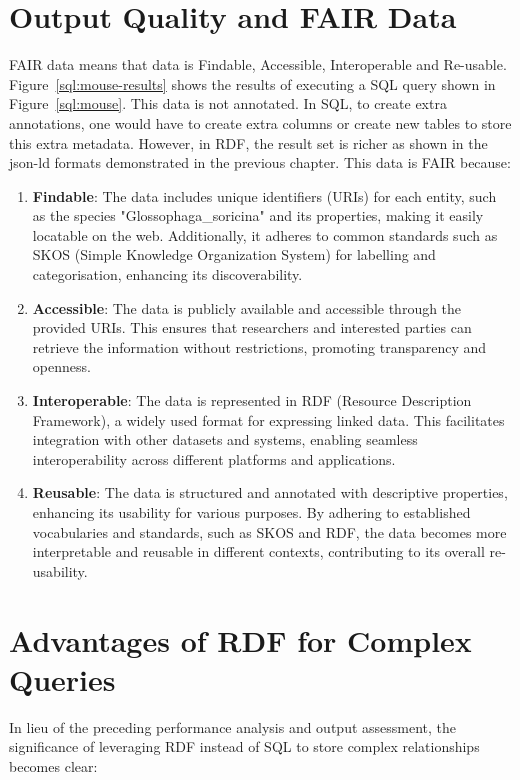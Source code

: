 \section{Output Quality and FAIR Data}

FAIR data means that data is Findable, Accessible, Interoperable and Re-usable.  Figure~\ref{sql:mouse-results} shows the results of executing a SQL query shown in Figure~\ref{sql:mouse}.  This data is not annotated.  In SQL, to create extra annotations, one would have to create extra columns or create new tables to store this extra metadata.  However, in RDF, the result set is richer as shown in the json-ld formats demonstrated in the previous chapter.  This data is FAIR because:

\begin{enumerate}
\item \textbf{Findable}: The data includes unique identifiers (URIs) for each entity, such as the species "Glossophaga\_soricina" and its properties, making it easily locatable on the web. Additionally, it adheres to common standards such as SKOS (Simple Knowledge Organization System) for labelling and categorisation, enhancing its discoverability.
\item \textbf{Accessible}: The data is publicly available and accessible through the provided URIs. This ensures that researchers and interested parties can retrieve the information without restrictions, promoting transparency and openness.
\item \textbf{Interoperable}: The data is represented in RDF (Resource Description Framework), a widely used format for expressing linked data. This facilitates integration with other datasets and systems, enabling seamless interoperability across different platforms and applications.
\item \textbf{Reusable}: The data is structured and annotated with descriptive properties, enhancing its usability for various purposes. By adhering to established vocabularies and standards, such as SKOS and RDF, the data becomes more interpretable and reusable in different contexts, contributing to its overall re-usability.
\end{enumerate}


\section{Advantages of RDF for Complex Queries}

In lieu of the preceding performance analysis and output assessment, the significance of leveraging RDF instead of SQL to store complex relationships becomes clear:


